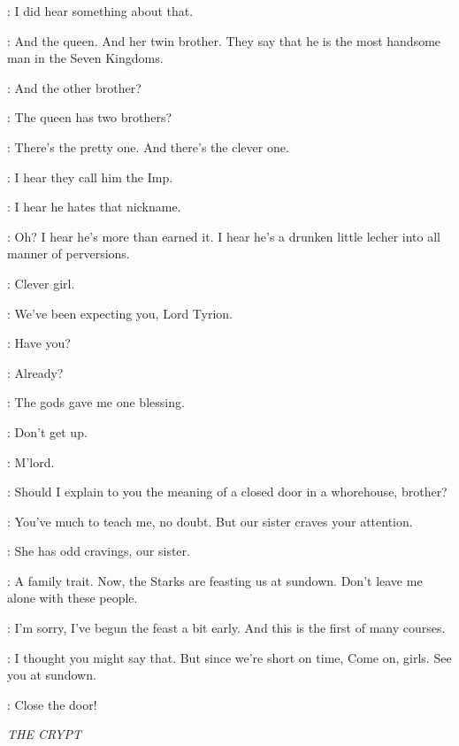 \TYRION: I did hear something about that. 

\ROS: And the queen. And her twin brother. They say that he is the most handsome man in the Seven Kingdoms. 

\TYRION: And the other brother? 

\ROS: The queen has two brothers? 

\TYRION: There's the pretty one. And there's the clever one. 

\ROS: I hear they call him the Imp. 

\TYRION: I hear he hates that nickname. 

\ROS: Oh? I hear he's more than earned it. I hear he's a drunken little lecher into all manner of perversions. 

\TYRION: Clever girl. 

\ROS: We've been expecting you, Lord Tyrion. 

\TYRION: Have you? 

\ROS:  Already?

\TYRION: The gods gave me one blessing. 


\JAIME: Don't get up. 

\ROS: M'lord. 

\TYRION: Should I explain to you the meaning of a closed door in a whorehouse, brother? 

\JAIME: You've much to teach me, no doubt. But our sister craves your attention. 

\TYRION: She has odd cravings, our sister. 

\JAIME: A family trait. Now, the Starks are feasting us at sundown. Don't leave me alone with these people. 

\TYRION: I'm sorry, I've begun the feast a bit early. And this is the first of many courses. 

\JAIME: I thought you might say that. But since we're short on time,  Come on, girls. See you at sundown. 


\TYRION: Close the door! 


\scene

\textit{THE CRYPT} 



